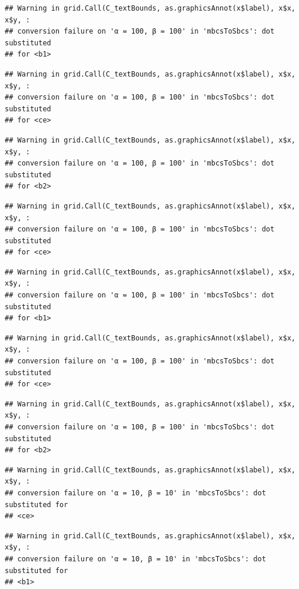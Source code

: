 \documentclass[]{book}
\theoremstyle{definition}
\theoremstyle{definition}
\theoremstyle{definition}
\theoremstyle{remark}
\begin{document}
\begin{verbatim}
## Warning in grid.Call(C_textBounds, as.graphicsAnnot(x$label), x$x, x$y, :
## conversion failure on 'α = 100, β = 100' in 'mbcsToSbcs': dot substituted
## for <b1>
\end{verbatim}

\begin{verbatim}
## Warning in grid.Call(C_textBounds, as.graphicsAnnot(x$label), x$x, x$y, :
## conversion failure on 'α = 100, β = 100' in 'mbcsToSbcs': dot substituted
## for <ce>
\end{verbatim}

\begin{verbatim}
## Warning in grid.Call(C_textBounds, as.graphicsAnnot(x$label), x$x, x$y, :
## conversion failure on 'α = 100, β = 100' in 'mbcsToSbcs': dot substituted
## for <b2>
\end{verbatim}

\begin{verbatim}
## Warning in grid.Call(C_textBounds, as.graphicsAnnot(x$label), x$x, x$y, :
## conversion failure on 'α = 100, β = 100' in 'mbcsToSbcs': dot substituted
## for <ce>
\end{verbatim}

\begin{verbatim}
## Warning in grid.Call(C_textBounds, as.graphicsAnnot(x$label), x$x, x$y, :
## conversion failure on 'α = 100, β = 100' in 'mbcsToSbcs': dot substituted
## for <b1>
\end{verbatim}

\begin{verbatim}
## Warning in grid.Call(C_textBounds, as.graphicsAnnot(x$label), x$x, x$y, :
## conversion failure on 'α = 100, β = 100' in 'mbcsToSbcs': dot substituted
## for <ce>
\end{verbatim}

\begin{verbatim}
## Warning in grid.Call(C_textBounds, as.graphicsAnnot(x$label), x$x, x$y, :
## conversion failure on 'α = 100, β = 100' in 'mbcsToSbcs': dot substituted
## for <b2>
\end{verbatim}

\begin{verbatim}
## Warning in grid.Call(C_textBounds, as.graphicsAnnot(x$label), x$x, x$y, :
## conversion failure on 'α = 10, β = 10' in 'mbcsToSbcs': dot substituted for
## <ce>
\end{verbatim}

\begin{verbatim}
## Warning in grid.Call(C_textBounds, as.graphicsAnnot(x$label), x$x, x$y, :
## conversion failure on 'α = 10, β = 10' in 'mbcsToSbcs': dot substituted for
## <b1>
\end{verbatim}
\end{document}
